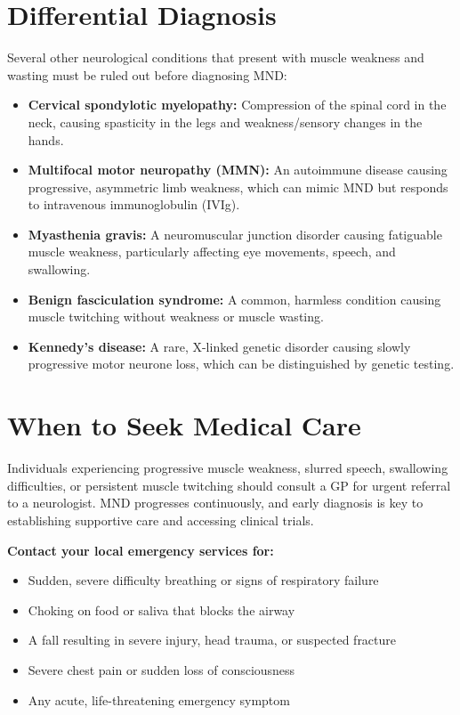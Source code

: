 \section*{Differential Diagnosis}
Several other neurological conditions that present with muscle weakness and wasting must be ruled out before diagnosing MND:

\begin{itemize}
    \item \textbf{Cervical spondylotic myelopathy:} Compression of the spinal cord in the neck, causing spasticity in the legs and weakness/sensory changes in the hands.
    \item \textbf{Multifocal motor neuropathy (MMN):} An autoimmune disease causing progressive, asymmetric limb weakness, which can mimic MND but responds to intravenous immunoglobulin (IVIg).
    \item \textbf{Myasthenia gravis:} A neuromuscular junction disorder causing fatiguable muscle weakness, particularly affecting eye movements, speech, and swallowing.
    \item \textbf{Benign fasciculation syndrome:} A common, harmless condition causing muscle twitching without weakness or muscle wasting.
    \item \textbf{Kennedy's disease:} A rare, X-linked genetic disorder causing slowly progressive motor neurone loss, which can be distinguished by genetic testing.
\end{itemize}

\section*{When to Seek Medical Care}
Individuals experiencing progressive muscle weakness, slurred speech, swallowing difficulties, or persistent muscle twitching should consult a GP for urgent referral to a neurologist. MND progresses continuously, and early diagnosis is key to establishing supportive care and accessing clinical trials.

\textbf{Contact your local emergency services for:}
\begin{itemize}
    \item Sudden, severe difficulty breathing or signs of respiratory failure
    \item Choking on food or saliva that blocks the airway
    \item A fall resulting in severe injury, head trauma, or suspected fracture
    \item Severe chest pain or sudden loss of consciousness
    \item Any acute, life-threatening emergency symptom
\end{itemize}

